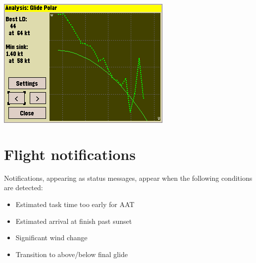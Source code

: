 \begin{center}
\includegraphics[angle=0,width=0.8\linewidth,keepaspectratio='true']{figures/shot-glidepolar.png}
\end{center}


\section{Flight notifications}

 Notifications, appearing as status messages, appear when the
 following conditions are detected: 
\begin{itemize}
\item Estimated task time too early for
 AAT 
\item Estimated arrival at finish past sunset
\item Significant wind change
\item Transition to above/below final glide
\end{itemize}
